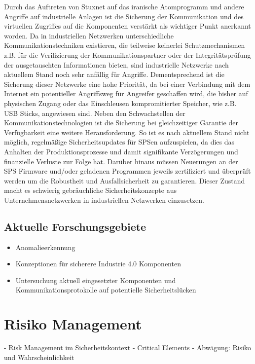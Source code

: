 Durch das Auftreten von Stuxnet auf das iranische Atomprogramm und andere Angriffe auf industrielle Anlagen ist die Sicherung der Kommunikation und des virtuellen Zugriffes auf die Komponenten verstärkt als wichtiger Punkt anerkannt worden. Da in industriellen Netzwerken unterschiedliche Kommunikationstechniken existieren, die teilweise keinerlei Schutzmechanismen z.B. für die Verifizierung der Kommunikationspartner oder der Integritätsprüfung der ausgetauschten Informationen bieten, sind industrielle Netzwerke nach aktuellem Stand noch sehr anfällig für Angriffe. Dementsprechend ist die Sicherung dieser Netzwerke eine hohe Priorität, da bei einer Verbindung mit dem Internet ein potentieller Angriffsweg für Angreifer geschaffen wird, die bisher auf physischen Zugang oder das Einschleusen kompromitierter Speicher, wie z.B. USB Sticks, angewiesen sind. 
Neben den Schwachstellen der Kommunikationstechnologien ist die Sicherung bei gleichzeitiger Garantie der Verfügbarkeit eine weitere Herausforderung. So ist es nach aktuellem Stand nicht möglich, regelmäßige Sicherheitsupdates für SPSen aufzuspielen, da dies das Anhalten der Produktionsprozesse und damit signifikante Verzögerungen und finanzielle Verluste zur Folge hat. Darüber hinaus müssen Neuerungen an der SPS Firmware und/oder geladenen Programmen jeweils zertifiziert und überprüft werden um die Robustheit und Ausfallsicherheit zu garantieren. Dieser Zustand macht es schwierig gebräuchliche Sicherheitskonzepte aus Unternehmensnetzwerken in industriellen Netzwerken einzusetzen.

\subsection{Aktuelle Forschungsgebiete}

\begin{itemize}
\item Anomalieerkennung
\item Konzeptionen für sicherere Industrie 4.0 Komponenten
\item Untersuchung aktuell eingesetzter Komponenten und Kommunikationsprotokolle auf potentielle Sicherheitslücken
\end{itemize}

\section{Risiko Management}
- Risk Management im Sicherheitskontext
- Critical Elements
- Abwägung: Risiko und Wahrscheinlichkeit
